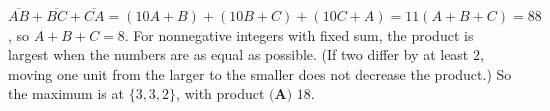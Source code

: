 \(\overline{AB}+\overline{BC}+\overline{CA}=(10A+B)+(10B+C)+(10C+A)=11(A+B+C)=88\), so \(A+B+C=8\). For nonnegative integers with fixed sum, the product is largest when the numbers are as equal as possible. (If two differ by at least \(2\), moving one unit from the larger to the smaller does not decrease the product.) So the maximum is at \(\{3,3,2\}\), with product \(\boxed{\textbf{(A) } 18}\).
